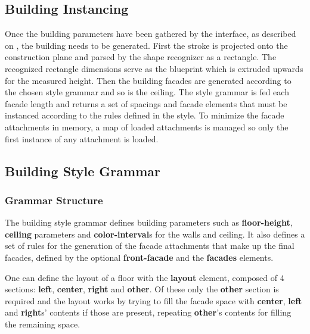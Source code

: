 

\subsection{Building Instancing}

Once the building parameters have been gathered by the interface, as described on ,
the building needs to be generated.
First the stroke is projected onto the construction plane and parsed by the shape recognizer as a rectangle.
The recognized rectangle dimensions serve as the blueprint which is extruded upwards for the measured height.
Then the building facades are generated according to the chosen style grammar and so is the ceiling.
The style grammar is fed each facade length and returns a set of spacings and facade elements that must be instanced
according to the rules defined in the style.
To minimize the facade attachments in memory, a map of loaded attachments is managed so only the first instance of any
attachment is loaded.


\subsection{Building Style Grammar}

\subsubsection{Grammar Structure}

The building style grammar defines building parameters such as
\textbf{floor-height}, \textbf{ceiling} parameters and \textbf{color-interval}s for the walls and ceiling.
It also defines a set of rules for the generation of the facade attachments that make up the final facades,
defined by the optional \textbf{front-facade} and the \textbf{facades} elements.

One can define the layout of a floor with the \textbf{layout} element, composed of 4 sections:
\textbf{left}, \textbf{center}, \textbf{right} and \textbf{other}.
Of these only the \textbf{other} section is required and the layout works by trying to fill the facade space with \textbf{center}, \textbf{left} and \textbf{right}s' contents if those are present, repeating \textbf{other}'s contents for filling the remaining space.

